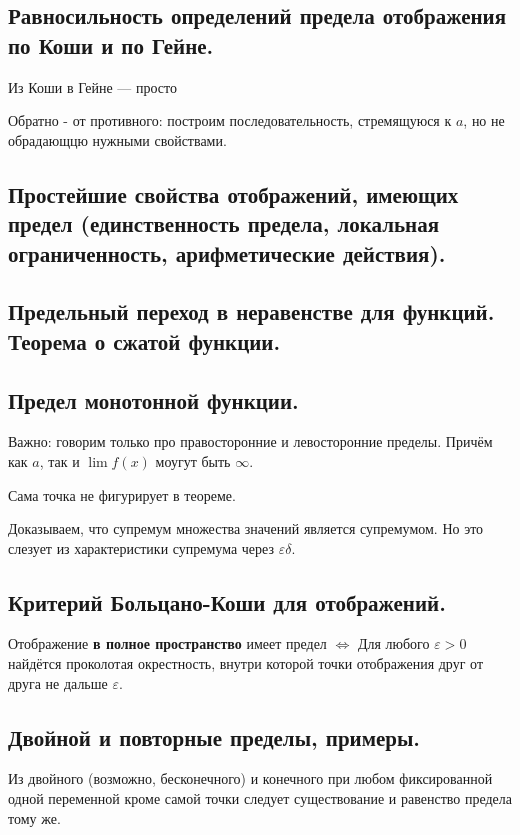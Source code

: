 \documentclass[12pt, a4paper]{article}
\begin{document}
\subsection{Равносильность определений предела отображения по Коши и по Гейне.}

Из Коши в Гейне — просто

Обратно - от противного: построим последовательность, стремящуюся к $a$, но не обрадающцю нужными свойствами.


\subsection{Простейшие свойства отображений, имеющих предел (единственность предела, локальная ограниченность, арифметические действия).}

\subsection{Предельный переход в неравенстве для функций. Теорема о сжатой функции.}

\subsection{Предел монотонной функции.}

Важно: говорим только про правосторонние и левосторонние пределы.
Причём как $a$, так и $\lim f(x)$ моугут быть $\infty$.

Сама точка не фигурирует в теореме.

Доказываем, что супремум множества значений является супремумом. 
Но это слезует из характеристики супремума через $\varepsilon\delta$.


\subsection{Критерий Больцано-Коши для отображений.}

Отображение \textbf{в полное пространство} имеет предел $\Longleftrightarrow$ 
Для любого $\varepsilon > 0$ найдётся проколотая окрестность, 
внутри которой точки отображения друг от друга не дальше $\varepsilon$.


\subsection{Двойной и повторные пределы, примеры.}

Из двойного (возможно, бесконечного) 
и конечного при любом фиксированной одной переменной кроме самой точки
следует существование и равенство предела тому же.
\end{document}
